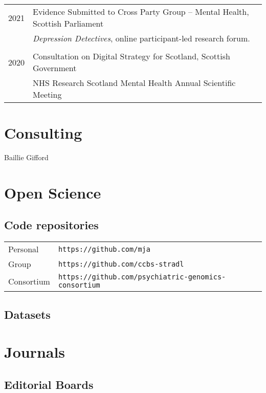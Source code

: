 \documentclass[11pt]{article}
\begin{document}
\begin{tabular}{p{3cm}p{12cm}}

2021 & Evidence Submitted to Cross Party Group -- Mental Health, Scottish Parliament \\
      & \emph{Depression Detectives}, online participant-led research forum.\\ \\
2020 & Consultation on Digital Strategy for Scotland, Scottish Government \\
     & NHS Research Scotland Mental Health Annual Scientific Meeting \\

\end{tabular}

\section*{Consulting}

Baillie Gifford

\section*{Open Science}

\subsection*{Code repositories}

\begin{tabular}{p{3cm}p{12cm}}

Personal &  \texttt{https://github.com/mja} \\
Group &  \texttt{https://github.com/ccbs-stradl} \\
Consortium & \texttt{https://github.com/psychiatric-genomics-consortium}

\end{tabular}

\subsection*{Datasets}

\printbibliography[type=misc,heading=none]

\section*{Journals}

\subsection*{Editorial Boards}
\end{document}
